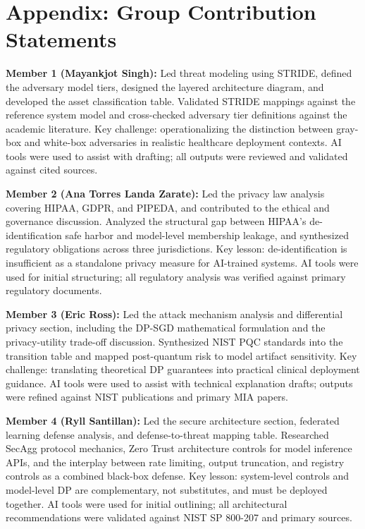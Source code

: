 \documentclass[conference]{IEEEtran}
\begin{document}
	\section*{Appendix: Group Contribution Statements}
	\textbf{Member 1 (Mayankjot Singh):} Led threat modeling using STRIDE, defined the adversary model tiers, designed the layered architecture diagram, and developed the asset classification table. Validated STRIDE mappings against the reference system model and cross-checked adversary tier definitions against the academic literature. Key challenge: operationalizing the distinction between gray-box and white-box adversaries in realistic healthcare deployment contexts. AI tools were used to assist with drafting; all outputs were reviewed and validated against cited sources.

	\textbf{Member 2 (Ana Torres Landa Zarate):} Led the privacy law analysis covering HIPAA, GDPR, and PIPEDA, and contributed to the ethical and governance discussion. Analyzed the structural gap between HIPAA's de-identification safe harbor and model-level membership leakage, and synthesized regulatory obligations across three jurisdictions. Key lesson: de-identification is insufficient as a standalone privacy measure for AI-trained systems. AI tools were used for initial structuring; all regulatory analysis was verified against primary regulatory documents.

	\textbf{Member 3 (Eric Ross):} Led the attack mechanism analysis and differential privacy section, including the DP-SGD mathematical formulation and the privacy-utility trade-off discussion. Synthesized NIST PQC standards into the transition table and mapped post-quantum risk to model artifact sensitivity. Key challenge: translating theoretical DP guarantees into practical clinical deployment guidance. AI tools were used to assist with technical explanation drafts; outputs were refined against NIST publications and primary MIA papers.

	\textbf{Member 4 (Ryll Santillan):} Led the secure architecture section, federated learning defense analysis, and defense-to-threat mapping table. Researched SecAgg protocol mechanics, Zero Trust architecture controls for model inference APIs, and the interplay between rate limiting, output truncation, and registry controls as a combined black-box defense. Key lesson: system-level controls and model-level DP are complementary, not substitutes, and must be deployed together. AI tools were used for initial outlining; all architectural recommendations were validated against NIST SP 800-207 and primary sources.
\end{document}
